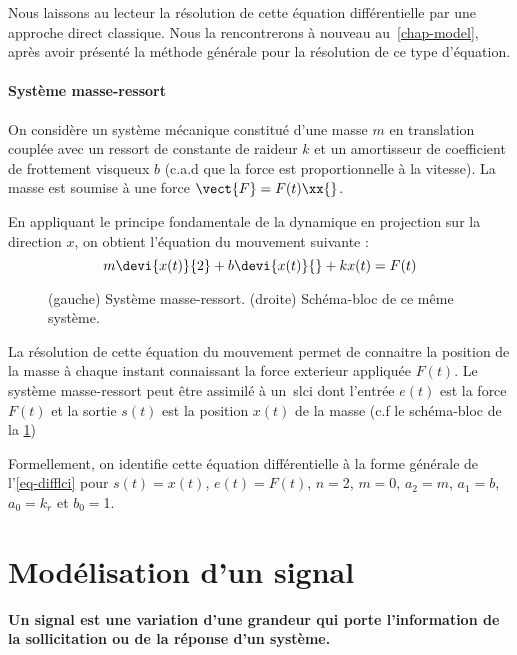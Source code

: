 Nous laissons au lecteur la résolution de cette équation différentielle 
par une approche direct classique.
Nous la rencontrerons à nouveau au~\cref{chap-model}, après avoir 
présenté la méthode générale pour la résolution de ce type d'équation.

\paragraph{Système masse-ressort}
On considère un système mécanique constitué d'une masse $m$ en translation 
couplée avec un ressort de constante
de raideur $k$ et un amortisseur de coefficient de frottement 
visqueux $b$ (c.a.d que la force est 
proportionnelle à la vitesse). 
La masse est soumise à une force $\vect{F}=F(t)\xx{}$.

En appliquant le principe fondamentale de la dynamique en projection 
sur la direction $x$, on obtient l'équation du mouvement suivante :
$$
m\devi{x(t)}{2}+b\devi{x(t)}{}+kx(t)=F(t)
$$
\begin{figure}[!h]
    \centering
    
    \caption{(gauche) Système masse-ressort. (droite) Schéma-bloc de ce même 
    système.
    \label{fig-masse-ressort}}
\end{figure}

La résolution de cette équation du mouvement permet de connaitre la position 
de la masse à chaque instant connaissant la force exterieur 
appliquée $F(t)$. Le système masse-ressort peut être assimilé à un~\gls{slci} 
dont l'entrée $e(t)$ est la force $F(t)$ et la sortie $s(t)$ est la 
position $x(t)$ de la masse (c.f le schéma-bloc de la \cref{fig-masse-ressort})

Formellement, on identifie cette équation différentielle à la forme générale 
de l'\cref{eq-difflci} pour $s(t)=x(t)$, $e(t)=F(t)$, 
$n=$2, $m=0$, $a_2=m$, $a_1=b$, $a_0=k_r$ et $b_0=$1.


\section{Modélisation d'un signal}
\textbf{Un signal est une variation d'une grandeur qui porte l'information 
de la sollicitation ou de la réponse d'un système.}

